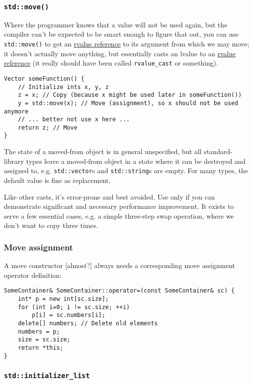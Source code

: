 \documentclass[8pt, table, xcdraw]{article}%
\begin{document}
\subsubsection{\lstinline{std::move()}}
Where the programmer knows that a value will not be used again, but the compiler can't be expected to be smart enough to figure that out, you can use \lstinline{std::move()} to get an \hyperref[rvaluereference]{rvalue reference} to its argument from which we may move; it doesn't actually move anything, but essentially casts an lvalue to an \hyperref[rvaluereference]{rvalue reference} (it really should have been called \lstinline{rvalue_cast} or something).

\begin{lstlisting}
Vector someFunction() {
    // Initialize ints x, y, z
    z = x; // Copy (because x might be used later in someFunction())
    y = std::move(x); // Move (assignment), so x should not be used anymore
    // ... better not use x here ...
    return z; // Move
}
\end{lstlisting}

The state of a moved-from object is in general unspecified, but all standard-library types leave a moved-from object in a state where it can be destroyed and assigned to, e.g. \lstinline{std::vector}s and \lstinline{std::string}s are empty. For many types, the default value is fine as replacement.

Like other casts, it’s error-prone and best avoided. Use only if you can demonstrate significant and necessary performance improvement. It exists to serve a few essential cases, e.g. a simple three-step swap operation, where we don't want to copy three times.

\subsubsection{Move assignment} \label{moveassignment}

A move constructor [almost?] always needs a corresponding move assignment operator definition:

\begin{lstlisting}
SomeContainer& SomeContainer::operator=(const SomeContainer& sc) {
    int* p = new int[sc.size];
    for (int i=0; i != sc.size; ++i)
        p[i] = sc.numbers[i];
    delete[] numbers; // Delete old elements
    numbers = p;
    size = sc.size;
    return *this;
}
\end{lstlisting}

\subsubsection{\lstinline{std::initializer_list}} \label{stdinitializerlist}
\end{document}
